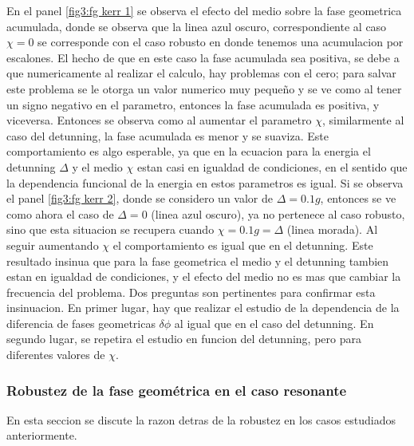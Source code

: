 En el panel \ref{fig3:fg kerr 1} se observa el efecto del medio sobre la fase geometrica acumulada, donde se observa que la linea azul oscuro, correspondiente al caso $\chi=0$ se corresponde con el caso robusto en donde tenemos una acumulacion por escalones. El hecho de que en este caso la fase acumulada sea positiva, se debe a que numericamente al realizar el calculo, hay problemas con el cero; para salvar este problema se le otorga un valor numerico muy pequeño y se ve como al tener un signo negativo en el parametro, entonces la fase acumulada es positiva, y viceversa. Entonces se observa como al aumentar el parametro $\chi$, similarmente al caso del detunning, la fase acumulada es menor y se suaviza. Este comportamiento es algo esperable, ya que en la ecuacion para la energia el detunning $\Delta$ y el medio $\chi$ estan casi en igualdad de condiciones, en el sentido que la dependencia funcional de la energia en estos parametros es igual.
Si se observa el panel \ref{fig3:fg kerr 2}, donde se considero un valor de $\Delta=0.1g$, entonces se ve como ahora el caso de $\Delta=0$ (linea azul oscuro), ya no pertenece al caso robusto, sino que esta situacion se recupera cuando $\chi=0.1g=\Delta$ (linea morada). Al seguir aumentando $\chi$ el comportamiento es igual que en el detunning. 
Este resultado insinua que para la fase geometrica el medio y el detunning tambien estan en igualdad de condiciones, y el efecto del medio no es mas que cambiar la frecuencia del problema. Dos preguntas son pertinentes para confirmar esta insinuacion. En primer lugar, hay que realizar el estudio de la dependencia de la diferencia de fases geometricas $\delta\phi$ al igual que en el caso del detunning. En segundo lugar, se repetira el estudio en funcion del detunning, pero para diferentes valores de $\chi$.

\subsubsection{Robustez de la fase geométrica en el caso resonante}
En esta seccion se discute la razon detras de la robustez en los casos estudiados anteriormente. 